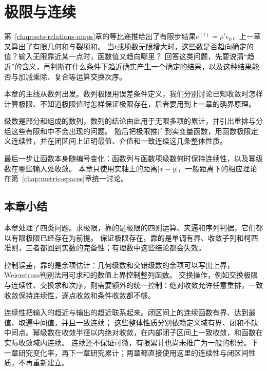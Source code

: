 \chapter{极限与连续}
\label{chap:limits-continuity}
\label{chap:function-limits}
\label{chap:mathematical-analysis}

第~\ref{chap:sets-relations-maps}章的等比递推给出了有限步结果$e^{(t)}=\rho^te_0$，上一章又算出了有限几何和与裂项和。
当$t$或项数无限增大时，这些数是否趋向确定的值？输入无限靠近某一点时，函数值又趋向哪里？
回答这类问题，先要说清“趋近”的含义，再判断在什么条件下趋近确实产生一个确定的结果，以及这种结果能否与加减乘除、复合等运算交换次序。

本章的主线从数列出发。数列极限用误差条件定义，我们分别讨论已知收敛时怎样计算极限、不知道极限值时怎样保证极限存在，后者要用到上一章的确界原理。

级数是部分和组成的数列，数列的结论由此用于无限多项的累计，并引出重排与分组这些有限和中不会出现的问题。
随后把极限推广到实变量函数，用函数极限定义连续性，并在闭区间上证明最值、介值和一致连续这几条整体性质。

最后一步让函数本身随编号变化：函数列与函数项级数何时保持连续性，以及幂级数在哪些输入处收敛。
本章只使用实轴上的距离$|x-y|$，一般距离下的相应理论在第~\ref{chap:metric-spaces}章统一讨论。








\FloatBarrier
\section{本章小结}
\label{sec:function-limits-summary}

本章处理了四类问题。求极限，靠的是极限的四则运算、夹逼和序列判据，它们都以有限极限已经存在为前提。
保证极限存在，靠的是单调有界、收敛子列和柯西准则，三者都回到实数的完备性；有理数中这些结论都会失效。

控制误差，靠的是余项估计：几何级数和交错级数的余项可以写出上界，Weierstrass判别法用可求和的数值上界控制整列函数。
交换操作，例如交换极限与连续性、交换求和次序，则需要额外的统一控制：绝对收敛允许任意重排，一致收敛保持连续性，逐点收敛和条件收敛都不够。

连续性把输入的趋近与输出的趋近联系起来。闭区间上的连续函数有界、达到最值、取遍中间值，并且一致连续；
这些整体性质分别依赖定义域有界、闭和不缺中间点。幂级数在收敛半径以内绝对收敛，在内部闭子区间上一致收敛，和函数在实际收敛域内连续。
连续还不保证可微，有限累计也尚未推广为一般的积分。下一章研究变化率，再下一章研究累计；两章都直接使用这里的连续性与闭区间性质，不再重新建立。
